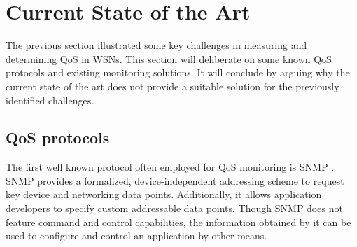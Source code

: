 

\section{Current State of the Art}
The previous section illustrated some key challenges in measuring and determining QoS in WSNs. This section will deliberate on some known QoS protocols and existing monitoring solutions. It will conclude by arguing why the current state of the art does not provide a suitable solution for the previously identified challenges.

\subsection{QoS protocols}
\label{sec:qos-protocols}
The first well known protocol often employed for QoS monitoring is SNMP \cite{snmp}. SNMP provides a formalized, device-independent addressing scheme to request key device and networking data points. Additionally, it allows application developers to specify custom addressable data points. Though SNMP does not feature command and control capabilities, the information obtained by it can be used to configure and control an application by other means.

